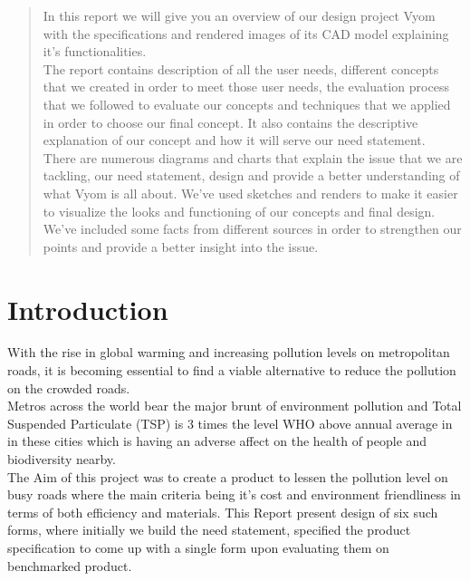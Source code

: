 \documentclass[12pt]{article}
\begin{document}
\begin{abstract}

In this report we will give you an overview of our design project Vyom with the specifications and rendered images of its CAD model explaining it's functionalities. \\

The report contains description of all the user needs, different concepts that we created in order to meet those user needs, the evaluation process that we followed to evaluate our concepts and techniques that we applied in order to choose our final concept. 
It also contains the descriptive explanation of our concept and how it will serve our need statement. \\

There are numerous diagrams and charts that explain the issue that we are tackling, our need statement, design and provide a better understanding of what Vyom is all about. We've used sketches and renders to make it easier to visualize the looks and functioning of our concepts and final design. We've included some facts from different sources in order to strengthen our points and provide a better insight into the issue.

\end{abstract}

\newpage

\section{Introduction}

With the rise in global warming and increasing pollution levels on metropolitan roads, it is becoming essential to find a viable alternative to reduce the pollution on the crowded roads. \\

Metros across the world bear the major brunt of environment pollution and Total Suspended Particulate (TSP) is 3 times the level WHO above annual average in in these cities which is having an adverse affect on the health of people and biodiversity nearby.\\

The Aim of this project was to create a product to lessen the pollution level on busy roads where the main criteria being it's cost and environment friendliness in terms of both efficiency and materials. This Report present design of six such forms, where initially we build the need statement, specified the product specification to come up with a single form upon evaluating them on benchmarked product. \\
\end{document}
